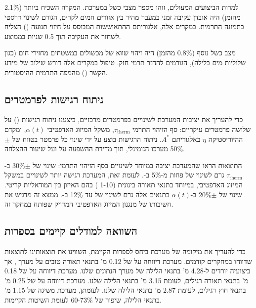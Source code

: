 למרות הביצועים המעולים, זוהו מספר מצבי כשל במערכת. המקרה השכיח ביותר (2.1\% מהזמן) היה אובדן עקיבה זמני במעבר מהיר בין אזורים חמים לקרים, הגורם לשינוי דרסטי בתמונה התרמית. במקרים אלה, אלגוריתם ההתאוששות המבוסס על חיזוי תנועה () הצליח לשחזר את העקיבה תוך 0.5 שניות בממוצע.

מצב כשל נוסף (0.8\% מהזמן) היה זיהוי שווא של מכשולים במשטחים מחזירי חום (כגון שלוליות מים בלילה), הגורמים להחזר תרמי חזק. טיפול במקרים אלה דורש שילוב של מידע הקשר () מהמפה התרמית ההיסטורית.

\subsection{ניתוח רגישות לפרמטרים}
\label{sec:ch08_sensitivity}

כדי להעריך את יציבות המערכת לשינויים בפרמטרים מרכזיים, ביצענו ניתוח רגישות () על שלושה פרמטרים עיקריים: סף הזיהוי התרמי $\tau_{\text{therm}}$, משקל המיזוג האדפטיבי $\alpha(t)$, ומקדם ההיוריסטיקה $\eta$ באלגוריתם $A^*$. ניתוח הרגישות בוצע על ידי שינוי כל פרמטר בטווח של $\pm$50\% מערכו הנומינלי, תוך מדידת ההשפעה על  ועל שיעור ההצלחה.

התוצאות הראו שהמערכת יציבה במיוחד לשינויים בסף הזיהוי התרמי: שינוי של $\pm$30\% ב-$\tau_{\text{therm}}$ גרם לשינוי של פחות מ-5\% ב-. לעומת זאת, המערכת רגישה יותר לשינויים במשקל המיזוג האדפטיבי, במיוחד בתנאי תאורה בינונית (1-10 ) בהם האיזון בין המודאליות קריטי. שינוי של $\pm$20\% ב-$\alpha(t)$ בתנאים אלה גרם לשינוי של עד 12\% ב-. ממצא זה מדגיש את חשיבותו של מנגנון המיזוג האדפטיבי המדויק שפותח במחקר זה.

\subsection{השוואה למודלים קיימים בספרות}
\label{sec:ch08_literature_comparison}

כדי להעריך את מיקומה של מערכת  ביחס לספרות הקיימת, השווינו את תוצאותינו לתוצאות שדווחו במחקרים קודמים. מערכת  \cite{MurArtal2015ORB} דיווחה על  של 0.12 מ' בתנאי תאורה טובים על מערך , אך ביצועיה יורדים ל-4.28 מ' בתנאי הלילה של מערך הנתונים שלנו. מערכת  \cite{Kalman1960} דיווחה על  של 0.18 מ' בתנאי תאורה רגילים, לעומת 3.15 מ' בתנאי הלילה שלנו. מערכת  \cite{Zhang2014LOAM} דיווחה על  של 0.25 מ' בתנאי חוץ רגילים, לעומת 2.87 מ' בתנאי הלילה שלנו. לעומתן, מערכת  משיגה  של 1.15 מ' בתנאי הלילה, שיפור של 60-73\% לעומת השיטות הקיימות.

